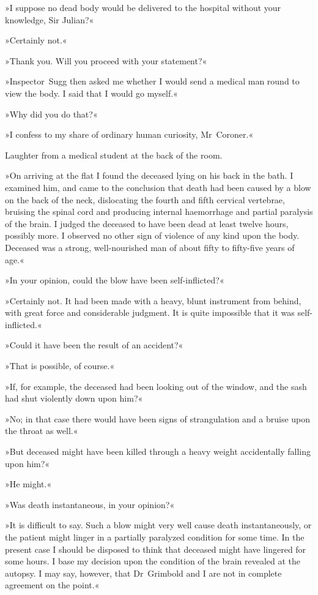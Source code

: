»I suppose no dead body would be delivered to the hospital without your knowledge, Sir Julian?«

»Certainly not.«

»Thank you. Will you proceed with your statement?«

»Inspector~Sugg then asked me whether I would send a medical man round to view the body. I said that I would go myself.«

»Why did you do that?«

»I confess to my share of ordinary human curiosity, Mr~Coroner.«

Laughter from a medical student at the back of the room.

»On arriving at the flat I found the deceased lying on his back in the bath. I examined him, and came to the conclusion that death had been caused by a blow on the back of the neck, dislocating the fourth and fifth cervical vertebrae, bruising the spinal cord and producing internal haemorrhage and partial paralysis of the brain. I judged the deceased to have been dead at least twelve hours, possibly more. I observed no other sign of violence of any kind upon the body. Deceased was a strong, well-nourished man of about fifty to fifty-five years of age.«

»In your opinion, could the blow have been self-inflicted?«

»Certainly not. It had been made with a heavy, blunt instrument from behind, with great force and considerable judgment. It is quite impossible that it was self-inflicted.«

»Could it have been the result of an accident?«

»That is possible, of course.«

»If, for example, the deceased had been looking out of the window, and the sash had shut violently down upon him?«

»No; in that case there would have been signs of strangulation and a bruise upon the throat as well.«

»But deceased might have been killed through a heavy weight accidentally falling upon him?«

»He might.«

»Was death instantaneous, in your opinion?«

»It is difficult to say. Such a blow might very well cause death instantaneously, or the patient might linger in a partially paralyzed condition for some time. In the present case I should be disposed to think that deceased might have lingered for some hours. I base my decision upon the condition of the brain revealed at the autopsy. I may say, however, that Dr~Grimbold and I are not in complete agreement on the point.«

